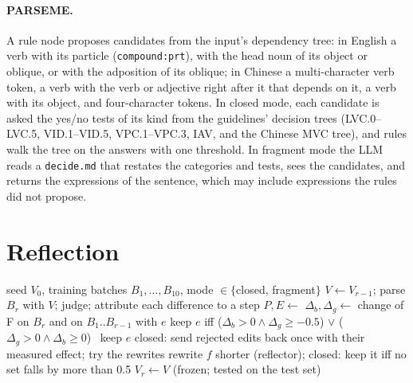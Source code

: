 \paragraph{PARSEME.} A rule node proposes candidates from the input's dependency tree: in English a verb with its particle (\texttt{compound:prt}), with the head noun of its object or oblique, or with the adposition of its oblique; in Chinese a multi-character verb token, a verb with the verb or adjective right after it that depends on it, a verb with its object, and four-character tokens. In closed mode, each candidate is asked the yes/no tests of its kind from the guidelines' decision trees (LVC.0--LVC.5, VID.1--VID.5, VPC.1--VPC.3, IAV, and the Chinese MVC tree), and rules walk the tree on the answers with one threshold. In fragment mode the LLM reads a \texttt{decide.md} that restates the categories and tests, sees the candidates, and returns the expressions of the sentence, which may include expressions the rules did not propose.

\section{Reflection}
\label{app:reflection}

\begin{algorithm}[h]
\caption{Reflection on five gold sentences per round.}
\label{alg:reflect}
\small
\begin{algorithmic}[1]
\Require seed $V_0$, training batches $B_1,\dots,B_{10}$, mode $\in\{$closed, fragment$\}$
  \State $V \gets V_{r-1}$; parse $B_r$ with $V$; judge; attribute each difference to a step
  \State $P, E \gets$ 
        \State $\Delta_b, \Delta_g \gets$ change of F on $B_r$ and on $B_1..B_{r-1}$ with $e$
        \State keep $e$ iff ($\Delta_b>0 \wedge \Delta_g \geq -0.5$) $\vee$ ($\Delta_g>0 \wedge \Delta_b\geq 0$)
      \Else\ keep $e$
      \EndIf
    \EndIf
  \EndFor
  \State closed: send rejected edits back once with their measured effect; try the rewrites
    \State rewrite $f$ shorter (reflector); closed: keep it iff no set falls by more than 0.5
  \EndFor
  \State $V_r \gets V$ (frozen; tested on the test set)
\EndFor
\end{algorithmic}
\end{algorithm}

